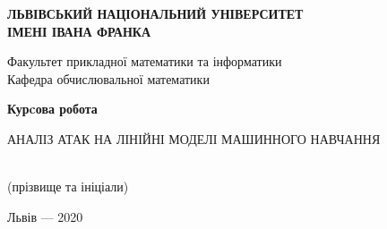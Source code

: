 \documentclass[a4paper,14pt]{extreport}
\begin{document}
	\begin{titlepage}%
    	\begin{center}
	    	{\textbf{ЛЬВІВСЬКИЙ НАЦІОНАЛЬНИЙ УНІВЕРСИТЕТ \\ ІМЕНІ ІВАНА ФРАНКА}}\par
	       	{Факультет прикладної математики та інформатики \\ Кафедра обчислювальної математики}\par
			\begin{center}
	
	        \end{center}
	        \vspace{25mm}
	        {\textbf{\huge{Курcова робота}}}\par
	        \vspace{5mm}
	        {АНАЛІЗ АТАК НА ЛІНІЙНІ МОДЕЛІ МАШИННОГО НАВЧАННЯ}\par
	        \vspace{5mm}
	        {}\par %
        \end{center}
	   	
	   	\vspace{30mm}
	   	
		\begin{flushright}
   	   		\begin{minipage}[t]{107mm}
   	   			 \\
	   	   		{\small{
			   	   		\hfill \footnotesize{(прізвище та ініціали)} \\
			   	   		\vspace{2ex}
				}}
   	   		\end{minipage}
   	   \end{flushright}
	   \vfill
   	   
   	   \begin{center}Львів --- 2020\end{center}
    \end{titlepage}
	\tableofcontents
\end{document}

